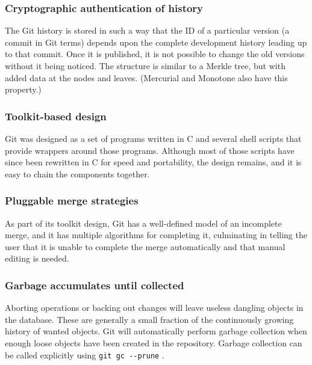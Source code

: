 \documentclass[a4paper]{report}
\begin{document}
\subsubsection{Cryptographic authentication of history}
The Git history is stored in such a way that the ID of a particular version (a commit in Git terms) depends upon the complete development history leading up to that commit. Once it is published, it is not possible to change the old versions without it being noticed. The structure is similar to a Merkle tree, but with added data at the nodes and leaves. (Mercurial and Monotone also have this property.)
\subsubsection{Toolkit-based design}
Git was designed as a set of programs written in C and several shell scripts that provide wrappers around those programs. Although most of those scripts have since been rewritten in C for speed and portability, the design remains, and it is easy to chain the components together.
\subsubsection{Pluggable merge strategies}
As part of its toolkit design, Git has a well-defined model of an incomplete merge, and it has multiple algorithms for completing it, culminating in telling the user that it is unable to complete the merge automatically and that manual editing is needed.
\subsubsection{Garbage accumulates until collected}
Aborting operations or backing out changes will leave useless dangling objects in the database. These are generally a small fraction of the continuously growing history of wanted objects. Git will automatically perform garbage collection when enough loose objects have been created in the repository. Garbage collection can be called explicitly using \lstinline !git gc --prune! .
\end{document}
